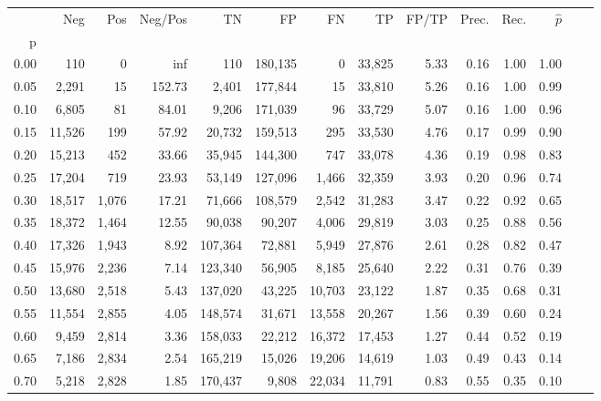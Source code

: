 \begin{tabular}{rrrrrrrrrrrrrr}
\toprule
{} &     Neg &    Pos & Neg/Pos &       TN &       FP &      FN &      TP & FP/TP & Prec. &  Rec. & $\hat{p}$ \\
p    &         &        &         &          &          &         &         &       &       &       &           \\
\midrule
0.00 &     110 &      0 &     inf &      110 &  180,135 &       0 &  33,825 &  5.33 &  0.16 &  1.00 &      1.00 \\
0.05 &   2,291 &     15 &  152.73 &    2,401 &  177,844 &      15 &  33,810 &  5.26 &  0.16 &  1.00 &      0.99 \\
0.10 &   6,805 &     81 &   84.01 &    9,206 &  171,039 &      96 &  33,729 &  5.07 &  0.16 &  1.00 &      0.96 \\
0.15 &  11,526 &    199 &   57.92 &   20,732 &  159,513 &     295 &  33,530 &  4.76 &  0.17 &  0.99 &      0.90 \\
0.20 &  15,213 &    452 &   33.66 &   35,945 &  144,300 &     747 &  33,078 &  4.36 &  0.19 &  0.98 &      0.83 \\
0.25 &  17,204 &    719 &   23.93 &   53,149 &  127,096 &   1,466 &  32,359 &  3.93 &  0.20 &  0.96 &      0.74 \\
0.30 &  18,517 &  1,076 &   17.21 &   71,666 &  108,579 &   2,542 &  31,283 &  3.47 &  0.22 &  0.92 &      0.65 \\
0.35 &  18,372 &  1,464 &   12.55 &   90,038 &   90,207 &   4,006 &  29,819 &  3.03 &  0.25 &  0.88 &      0.56 \\
0.40 &  17,326 &  1,943 &    8.92 &  107,364 &   72,881 &   5,949 &  27,876 &  2.61 &  0.28 &  0.82 &      0.47 \\
0.45 &  15,976 &  2,236 &    7.14 &  123,340 &   56,905 &   8,185 &  25,640 &  2.22 &  0.31 &  0.76 &      0.39 \\
0.50 &  13,680 &  2,518 &    5.43 &  137,020 &   43,225 &  10,703 &  23,122 &  1.87 &  0.35 &  0.68 &      0.31 \\
0.55 &  11,554 &  2,855 &    4.05 &  148,574 &   31,671 &  13,558 &  20,267 &  1.56 &  0.39 &  0.60 &      0.24 \\
0.60 &   9,459 &  2,814 &    3.36 &  158,033 &   22,212 &  16,372 &  17,453 &  1.27 &  0.44 &  0.52 &      0.19 \\
0.65 &   7,186 &  2,834 &    2.54 &  165,219 &   15,026 &  19,206 &  14,619 &  1.03 &  0.49 &  0.43 &      0.14 \\
0.70 &   5,218 &  2,828 &    1.85 &  170,437 &    9,808 &  22,034 &  11,791 &  0.83 &  0.55 &  0.35 &      0.10 \\

\end{tabular}
